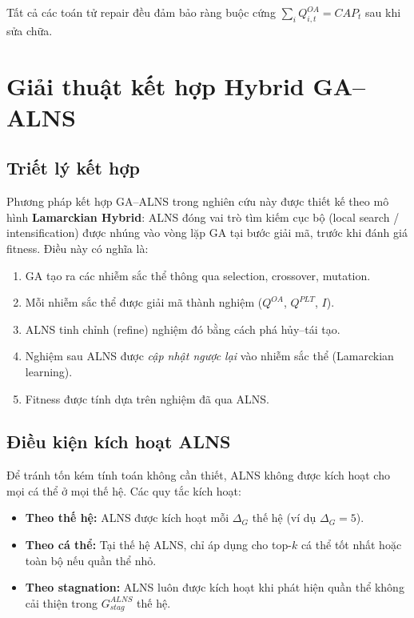 \documentclass[12pt]{article}
\newcommand{\QOA}{Q^{OA}}
\newcommand{\QPLT}{Q^{PLT}}
\begin{document}
\noindent Tất cả các toán tử repair đều đảm bảo ràng buộc cứng $\sum_i \QOA_{i,t} = CAP_t$ sau khi sửa chữa.



\section{Giải thuật kết hợp Hybrid GA--ALNS}

\subsection{Triết lý kết hợp}

Phương pháp kết hợp GA--ALNS trong nghiên cứu này được thiết kế theo mô hình \textbf{Lamarckian Hybrid}: ALNS đóng vai trò tìm kiếm cục bộ (local search / intensification) được nhúng vào vòng lặp GA tại bước giải mã, trước khi đánh giá fitness. Điều này có nghĩa là:

\begin{enumerate}
  \item GA tạo ra các nhiễm sắc thể thông qua selection, crossover, mutation.
  \item Mỗi nhiễm sắc thể được giải mã thành nghiệm ($\QOA$, $\QPLT$, $I$).
  \item ALNS tinh chỉnh (refine) nghiệm đó bằng cách phá hủy--tái tạo.
  \item Nghiệm sau ALNS được \emph{cập nhật ngược lại} vào nhiễm sắc thể (Lamarckian learning).
  \item Fitness được tính dựa trên nghiệm đã qua ALNS.
\end{enumerate}

\subsection{Điều kiện kích hoạt ALNS}

Để tránh tốn kém tính toán không cần thiết, ALNS không được kích hoạt cho mọi cá thể ở mọi thế hệ. Các quy tắc kích hoạt:

\begin{itemize}
  \item \textbf{Theo thế hệ:} ALNS được kích hoạt mỗi $\Delta_G$ thế hệ (ví dụ $\Delta_G = 5$).
  \item \textbf{Theo cá thể:} Tại thế hệ ALNS, chỉ áp dụng cho top-$k$ cá thể tốt nhất hoặc toàn bộ nếu quần thể nhỏ.
  \item \textbf{Theo stagnation:} ALNS luôn được kích hoạt khi phát hiện quần thể không cải thiện trong $G_{stag}^{ALNS}$ thế hệ.
\end{itemize}
\end{document}
